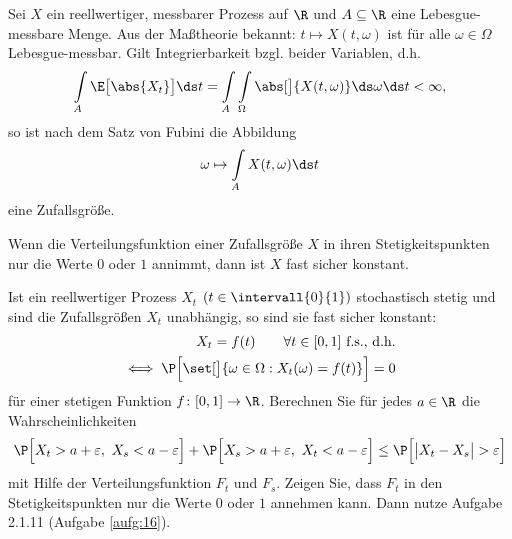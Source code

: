 \begin{bemerkungnr}\label{bemerkung2.1.10}
	Sei $X$ ein reellwertiger, messbarer Prozess auf $\R$ und $A\subseteq\R$ eine Lebesgue-messbare Menge.
	Aus der Maßtheorie bekannt:
	$t\mapsto X(t,\omega)$ ist für alle $\omega\in\Omega$ Lebesgue-messbar.
	Gilt Integrierbarkeit bzgl. beider Variablen, d.h.
	\begin{align*}
		\int\limits_A\E\big[\abs{X_t}\big]\ds t
		=\int\limits_A\int\limits_\Omega\abs[\big]{X(t,\omega)}\ds\omega\ds t<\infty,
	\end{align*}
	so ist nach dem Satz von Fubini die Abbildung
	\begin{align*}
		\omega\mapsto\int\limits_A X(t,\omega)\ds t
	\end{align*}
	eine Zufallsgröße.
\end{bemerkungnr}

\begin{aufgabenr}\label{aufg:16}\enter
	Wenn die Verteilungsfunktion einer Zufallsgröße $X$ in ihren Stetigkeitspunkten nur die Werte $0$ oder $1$ annimmt, dann ist $X$ fast sicher konstant.
\end{aufgabenr}

\begin{aufgabenr}\label{aufg:17}\enter
	Ist ein reellwertiger Prozess $X_t$ $(t\in\intervall{0}{1})$ stochastisch stetig und sind die Zufallsgrößen $X_t$ unabhängig, so sind sie fast sicher konstant:
	\begin{align*}
		X_t=f(t)\qquad\forall t\in[0,1]\text{ f.s., d.h.}\\
		\iff \P\Big[\set[\big]{\omega\in\Omega: X_t(\omega)=f(t)}\Big]=0
	\end{align*}
	für einer stetigen Funktion $f\colon[0,1]\to\R$.\nl
	 Berechnen Sie für jedes $a\in\R$ die Wahrscheinlichkeiten
	\begin{align*}
		\P\Big[ X_t>a+\varepsilon,~X_s<a-\varepsilon\Big]
		+
		\P\Big[ X_s>a+\varepsilon,~X_t<a-\varepsilon\Big]
		\leq
		\P\Big[\big| X_t-X_s\big|>\varepsilon\Big]
	\end{align*}
	mit Hilfe der Verteilungsfunktion $F_t$ und $F_s$.
	Zeigen Sie, dass $F_t$ in den Stetigkeitspunkten nur die Werte $0$ oder $1$ annehmen kann.
	Dann nutze Aufgabe 2.1.11 (Aufgabe \ref{aufg:16}).
\end{aufgabenr}


